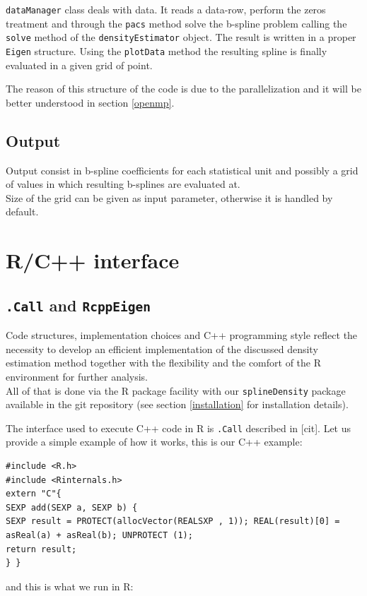 \verb|dataManager| class deals with data. It reads a data-row, perform the zeros treatment and through the \verb|pacs| method solve the b-spline problem calling the \verb|solve| method of the \verb|densityEstimator| object. The result is written in a proper \verb|Eigen| structure. Using the \verb|plotData| method the resulting spline is finally evaluated in a given grid of point.

The reason of this structure of the code is due to the parallelization and it will be better understood in section \ref{openmp}.

\subsection{Output}
Output consist in b-spline coefficients for each statistical unit and possibly a grid of values in which resulting b-splines are evaluated at. \\ Size of the grid can be given as input parameter, otherwise it is handled by default.

\section{R/C++ interface} \label{R}
\subsection{\texttt{.Call} and \texttt{RcppEigen}}
Code structures, implementation choices and C++ programming style reflect the necessity to develop an efficient implementation of the discussed density estimation method together with the flexibility and the comfort of the R environment for further analysis. \\ All of that is done via the R package facility with our \verb|splineDensity| package available in the git repository (see section \ref{installation} for installation details). 

The interface used to execute C++ code in R is \verb|.Call| described in [cit]. Let us provide a simple example of how it works, this is our C++ example:

\begin{lstlisting}
#include <R.h>
#include <Rinternals.h>
extern "C"{
SEXP add(SEXP a, SEXP b) {
SEXP result = PROTECT(allocVector(REALSXP , 1)); REAL(result)[0] = asReal(a) + asReal(b); UNPROTECT (1);
return result;
} }
\end{lstlisting}

and this is what we run in R:

